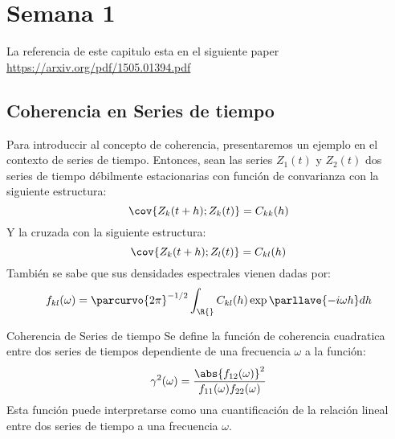 \section{Semana 1}
La referencia de este capitulo esta en el siguiente paper \href{https://arxiv.org/pdf/1505.01394.pdf}{https://arxiv.org/pdf/1505.01394.pdf}
\subsection{Coherencia en Series de tiempo}
Para introduccir al concepto de coherencia, presentaremos un ejemplo en el contexto de series de tiempo. Entonces, sean las series $Z_1(t)$ y $Z_2 (t)$ dos series de tiempo débilmente estacionarias con función de convarianza con la siguiente estructura:
$$
\cov{
Z_k(t+h) ; Z_k(t)
} = C_{kk}(h)
$$
Y la cruzada con la siguiente estructura:
$$
\cov{
Z_k(t+h) ; Z_l(t)
} = C_{kl}(h)
$$
También se sabe que sus densidades espectrales vienen dadas por:
$$
f_{kl}(\omega) = \parcurvo{2\pi}^{-1/2}\int_{\R{}} C_{kl}(h)\exp\parllave{- i \omega h} dh
$$
\begin{defi*}{Coherencia de Series de tiempo}
Se define la función de coherencia cuadratica entre dos series de tiempos dependiente de una frecuencia $\omega$ a la función:
$$
\gamma^2(\omega) = \dfrac{
\abs{f_{12}(\omega)}^2
}{
f_{11}(\omega) f_{22}(\omega)
}
$$
Esta función puede interpretarse como una cuantificación de la relación lineal entre dos series de tiempo a una frecuencia $\omega$.
\end{defi*}
